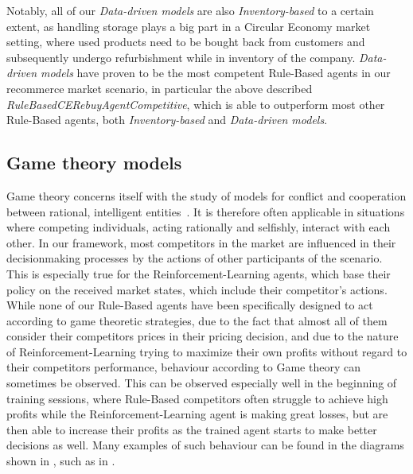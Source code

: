 Notably, all of our \emph{Data-driven models} are also \emph{Inventory-based} to a certain extent, as handling storage plays a big part in a Circular Economy market setting, where used products need to be bought back from customers and subsequently undergo refurbishment while in inventory of the company. \emph{Data-driven models} have proven to be the most competent Rule-Based agents in our recommerce market scenario, in particular the above described \emph{RuleBasedCERebuyAgentCompetitive}, which is able to outperform most other Rule-Based agents, both \emph{Inventory-based} and \emph{Data-driven models}.

\subsection*{Game theory models}\label{subsec:GameTheory}

Game theory concerns itself with the study of models for conflict and cooperation between rational, intelligent entities~\cite{GameTheory}. It is therefore often applicable in situations where competing individuals, acting rationally and selfishly, interact with each other. In our framework, most competitors in the market are influenced in their decisionmaking processes by the actions of other participants of the scenario. This is especially true for the Reinforcement-Learning agents, which base their policy on the received market states, which include their competitor's actions. While none of our Rule-Based agents have been specifically designed to act according to game theoretic strategies, due to the fact that almost all of them consider their competitors prices in their pricing decision, and due to the nature of Reinforcement-Learning trying to maximize their own profits without regard to their competitors performance, behaviour according to Game theory can sometimes be observed. This can be observed especially well in the beginning of training sessions, where Rule-Based competitors often struggle to achieve high profits while the Reinforcement-Learning agent is making great losses, but are then able to increase their profits as the trained agent starts to make better decisions as well. Many examples of such behaviour can be found in the diagrams shown in , such as in .

